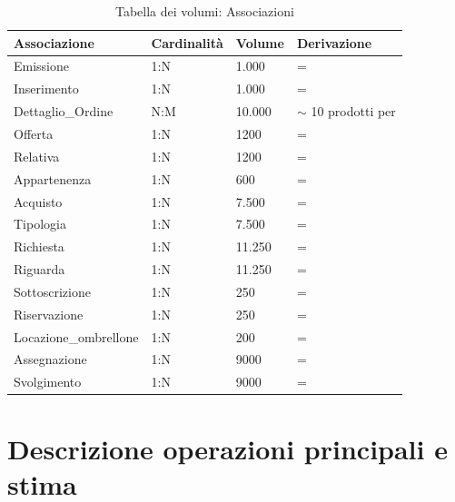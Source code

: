 \begin{table}[H]  %
  \centering
  \caption{Tabella dei volumi: Associazioni}
  \label{tab:volumi-associazioni}
  \begin{tabularx}{\textwidth}{L{3cm} C{2.5cm} R{1.6cm} L{7.2cm}}
    \toprule
    \textbf{Associazione} & \textbf{Cardinalità} & \textbf{Volume} & \textbf{Derivazione} \\
    \midrule
    Emissione             & 1:N     & 1.000   & =  \\
    Inserimento           & 1:N     & 1.000   & =  \\
    Dettaglio\_Ordine     & N:M     & 10.000  & $\sim$ 10 prodotti per  \\
    Offerta               & 1:N     & 1200    & =  \\
    Relativa              & 1:N     & 1200    & =  \\
    Appartenenza          & 1:N     & 600     & =  \\
    Acquisto              & 1:N     & 7.500   & =  \\
    Tipologia             & 1:N     & 7.500   & =  \\
    Richiesta             & 1:N     & 11.250  & =  \\
    Riguarda              & 1:N     & 11.250  & =  \\
    Sottoscrizione        & 1:N     & 250     & =  \\
    Riservazione          & 1:N     & 250     & =  \\
    Locazione\_ombrellone & 1:N     & 200     & =  \\
    Assegnazione          & 1:N     & 9000    & =  \\
    Svolgimento           & 1:N     & 9000    & =  \\
    \bottomrule
  \end{tabularx}
\end{table}


\section{Descrizione operazioni principali e stima}\label{sec:operazioniPrincipali}


